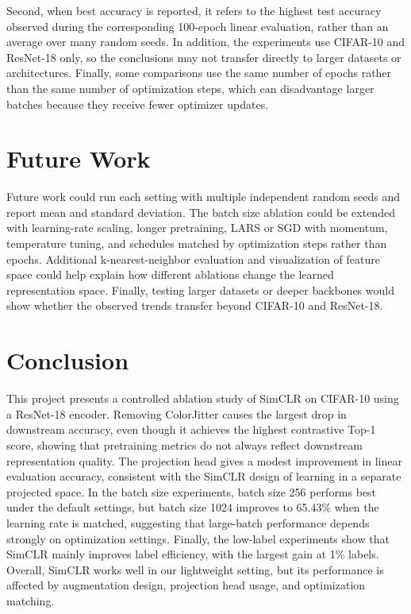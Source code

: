 \documentclass[10pt]{article}
\begin{document}
Second, when best accuracy is reported, it refers to the highest test accuracy observed during the corresponding 100-epoch linear evaluation, rather than an average over many random seeds. In addition, the experiments use CIFAR-10 and ResNet-18 only, so the conclusions may not transfer directly to larger datasets or architectures. Finally, some comparisons use the same number of epochs rather than the same number of optimization steps, which can disadvantage larger batches because they receive fewer optimizer updates.

\section{Future Work}

Future work could run each setting with multiple independent random seeds and report mean and standard deviation. The batch size ablation could be extended with learning-rate scaling, longer pretraining, LARS or SGD with momentum, temperature tuning, and schedules matched by optimization steps rather than epochs. Additional k-nearest-neighbor evaluation and visualization of feature space could help explain how different ablations change the learned representation space. Finally, testing larger datasets or deeper backbones would show whether the observed trends transfer beyond CIFAR-10 and ResNet-18.

\section{Conclusion}

This project presents a controlled ablation study of SimCLR on CIFAR-10 using a ResNet-18 encoder. Removing ColorJitter causes the largest drop in downstream accuracy, even though it achieves the highest contrastive Top-1 score, showing that pretraining metrics do not always reflect downstream representation quality. The projection head gives a modest improvement in linear evaluation accuracy, consistent with the SimCLR design of learning in a separate projected space. In the batch size experiments, batch size 256 performs best under the default settings, but batch size 1024 improves to 65.43\% when the learning rate is matched, suggesting that large-batch performance depends strongly on optimization settings. Finally, the low-label experiments show that SimCLR mainly improves label efficiency, with the largest gain at 1\% labels. Overall, SimCLR works well in our lightweight setting, but its performance is affected by augmentation design, projection head usage, and optimization matching.
\end{document}
